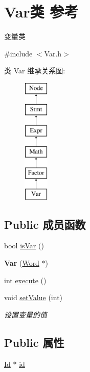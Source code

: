 \hypertarget{class_var}{}\section{Var类 参考}
\label{class_var}


变量类  




{\ttfamily \#include $<$Var.\+h$>$}

类 Var 继承关系图\+:\begin{figure}[H]
\begin{center}
\leavevmode
\includegraphics[height=6.000000cm]{class_var}
\end{center}
\end{figure}
\subsection*{Public 成员函数}
\begin{DoxyCompactItemize}
\item 
bool \hyperlink{class_var_a50aa6f54310903a8bc36184813a2b9ef}{is\+Var} ()
\item 
\mbox{\label{class_var_ab111df39c1575d7ba1f96f3b89574b8c}} 
{\bfseries Var} (\hyperlink{class_word}{Word} $\ast$)
\item 
int \hyperlink{class_var_a9dc96e803f7b0f9aa519c2c0e0a6bd8f}{execute} ()
\item 
\mbox{\label{class_var_af0f42d31f5001ff4d4781b9ba199a612}} 
void \hyperlink{class_var_af0f42d31f5001ff4d4781b9ba199a612}{set\+Value} (int)
\begin{DoxyCompactList}\small\item\em 设置变量的值 \end{DoxyCompactList}\end{DoxyCompactItemize}
\subsection*{Public 属性}
\begin{DoxyCompactItemize}
\item 
\hyperlink{class_id}{Id} $\ast$ \hyperlink{class_var_a3e5c7c9425da4659290da5c0553c7dc6}{id}
\end{DoxyCompactItemize}
